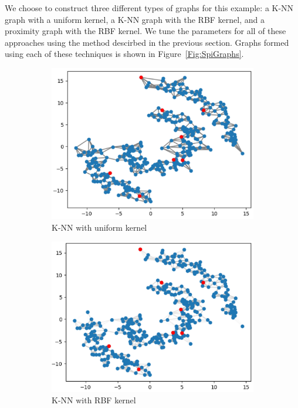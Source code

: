 \documentclass[12pt]{amsart}
\begin{document}
We choose to construct three different types of graphs for this example: a K-NN graph with a uniform kernel, a K-NN graph with the RBF kernel, and a proximity graph with the RBF kernel. We tune the parameters for all of these approaches using the method descirbed in the previous section. Graphs formed using each of these techniques is shown in Figure~\ref{Fig:SpiGraphs}.
    \begin{figure}[ht] 
  \begin{subfigure}{0.475\linewidth}
    \centering
    \includegraphics[width=0.8\linewidth]{Figures/SpiKNNUni.png} 
    \caption{K-NN with uniform kernel} 
    \label{Fig:SpiKNNUni}
  \end{subfigure}%
  \begin{subfigure}{0.475\linewidth}
    \centering
    \includegraphics[width=0.8\linewidth]{Figures/SpiKNNRBF.png} 
    \caption{K-NN with RBF kernel} 
    \label{Fig:SpiKNNRBF}
  \end{subfigure} 
    \begin{subfigure}{0.475\linewidth}
    \centering

\end{subfigure}
\end{figure}
\end{document}
